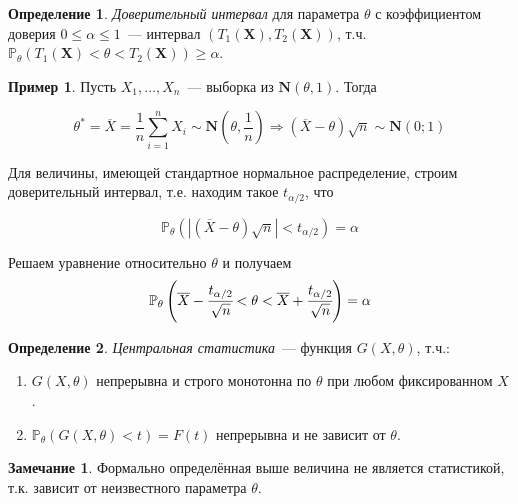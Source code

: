 \documentclass[oneside,final,14pt]{extreport}
\theoremstyle{plain}
\theoremstyle{definition}
\newtheorem*{defn}{Определение}
\newtheorem*{exmp}{Пример}
\newtheorem*{rmrk}{Замечание}
\theoremstyle{named}
\begin{document}
\begin{defn}
{\it Доверительный интервал} для параметра $\theta$ с коэффициентом доверия $0 \leqslant \alpha \leqslant 1$~--- интервал $(T_1(\mathbf{X}), T_2(\mathbf{X}))$, т.ч. $\mathbb{P}_{\theta}(T_1(\mathbf{X}) < \theta < T_2(\mathbf{X})) \geq \alpha$.
\end{defn}

\begin{exmp}
Пусть $X_1, \ldots, X_n$~--- выборка из $\mathbf{N}(\theta, 1)$. Тогда

\begin{equation*}
    \theta^{*}
    = \overline{X}
    = \frac{1}{n} \sum\limits_{i=1}^{n} X_{i} \sim \mathbf{N}\left(\theta, \frac{1}{n}\right)
    \Rightarrow (\overline{X}-\theta) \sqrt{n} \sim \mathbf{N}(0;1)
\end{equation*}

Для величины, имеющей стандартное нормальное распределение, строим доверительный интервал, т.е. находим такое $t_{\alpha / 2}$, что 

\begin{equation*}
    \mathbb{P}_{\theta}\left(|(\overline{X}-\theta) \sqrt{n}|<t_{\alpha / 2}\right)=\alpha
\end{equation*}

Решаем уравнение относительно $\theta$ и получаем
\begin{equation*}
    \mathbb{P}_{\theta}\left(\overline{X}-\cfrac{t_{\alpha / 2}}{\sqrt{n}}<\theta<\overline{X}+\cfrac{t_{\alpha / 2}}{\sqrt{n}}\right)=\alpha 
\end{equation*}

\end{exmp}

\begin{defn}
{\it Центральная статистика}~--- функция $G(X,\theta)$, т.ч.:
\begin{enumerate}
    \item $G(X,\theta)$ непрерывна и строго монотонна по $\theta$ при любом фиксированном $X$.
    \item $\mathbb{P}_{\theta}(G(X, \theta)<t)=F(t)$ непрерывна и не зависит от $\theta$.
\end{enumerate}
\end{defn}

\begin{rmrk}
Формально определённая выше величина не является статистикой, т.к. зависит от неизвестного параметра $\theta$.
\end{rmrk}
\end{document}

